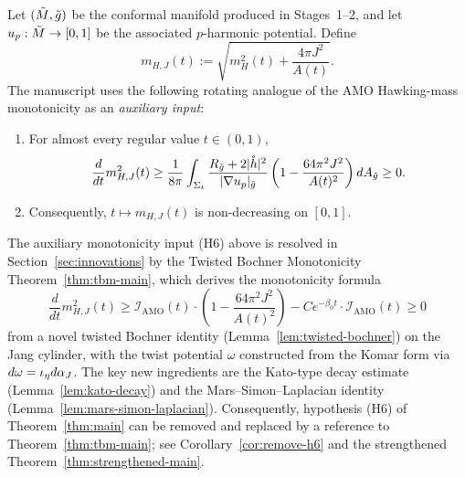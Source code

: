 \begin{theorem}\label{thm:monotone}
Let $(\tilde{M},\tilde{g})$ be the conformal manifold produced in Stages~1--2, and let $u_p:\tilde{M}\to[0,1]$ be the associated $p$-harmonic potential. Define
\[
m_{H,J}(t):=\sqrt{m_H^2(t)+\frac{4\pi J^2}{A(t)}}.
\]
The manuscript uses the following rotating analogue of the AMO Hawking-mass monotonicity as an \emph{auxiliary input}:
\begin{enumerate}[label=\textup{(\roman*)}]
    \item For almost every regular value $t\in(0,1)$,
    \[
    \frac{d}{dt} m_{H,J}^2(t) \geq \frac{1}{8\pi}\int_{\Sigma_t} \frac{R_{\tilde{g}} + 2|\mathring{h}|^2}{|\nabla u_p|_{\tilde{g}}} \left(1 - \frac{64\pi^2 J^2}{A(t)^2}\right) dA_{\tilde{g}} \geq 0.
    \]
    \item Consequently, $t\mapsto m_{H,J}(t)$ is non-decreasing on $[0,1]$.
\end{enumerate}
\end{theorem}

\begin{remark}\label{rem:tbm-resolution}
The auxiliary monotonicity input (H6) above is resolved in Section~\ref{sec:innovations} by the Twisted Bochner Monotonicity Theorem~\ref{thm:tbm-main}, which derives the monotonicity formula
\[
\frac{d}{dt} m_{H,J}^2(t) \geq \mathcal{I}_{\mathrm{AMO}}(t) \cdot \left(1 - \frac{64\pi^2 J^2}{A(t)^2}\right) - C e^{-\beta_0 t} \cdot \mathcal{I}_{\mathrm{AMO}}(t) \geq 0
\]
from a novel twisted Bochner identity (Lemma~\ref{lem:twisted-bochner}) on the Jang cylinder, with the twist potential $\omega$ constructed from the Komar form via $d\omega = \iota_\eta d\alpha_J$. The key new ingredients are the Kato-type decay estimate (Lemma~\ref{lem:kato-decay}) and the Mars--Simon--Laplacian identity (Lemma~\ref{lem:mars-simon-laplacian}). Consequently, hypothesis (H6) of Theorem~\ref{thm:main} can be removed and replaced by a reference to Theorem~\ref{thm:tbm-main}; see Corollary~\ref{cor:remove-h6} and the strengthened Theorem~\ref{thm:strengthened-main}.
\end{remark}

